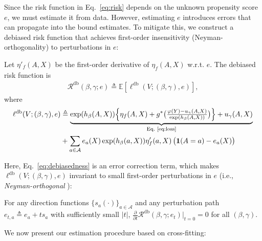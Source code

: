 Since the risk function in Eq.~\eqref{eq:risk} depends on the unknown propensity score $e$, we must estimate it from data. However, estimating $e$ introduces errors that can propagate into the bound estimates. To mitigate this, we construct a debiased risk function that achieves first-order insensitivity (Neyman-orthogonality) to perturbations in $e$:
\begin{definition}\label{def:debiased-risk}
    \normalfont
    Let $\eta'_f(A,X)$ be the first-order derivative of $\eta_f(A,X)$ w.r.t. $e$. The debiased risk function is 
    \begin{align}\label{eq:debiased-risk}
        \mathcal{R}^{\mathrm{db}}(\beta, \gamma; e) \triangleq \mathbb{E}[\ell^{\mathrm{db}}(V; (\beta, \gamma), e)],
    \end{align}
    where 
    \begin{align}
        \ell^{\mathrm{db}}(V; (\beta, \gamma), e) &\triangleq  \underbrace{ \exp(h_{\beta}(A,X))\Big\{\eta_{f}(A,X) + g^{\ast}\big( \tfrac{\varphi(Y) - u_{\gamma}(A,X)}{\exp(h_{\beta}(A,X))}\big) \Big\}  + u_{\gamma}(A,X) }_{\text{Eq.~\eqref{eq:loss}}} \\ 
        &+ \sum_{a\in\mathcal{A}} e_a(X)\exp(h_{\beta}(a,X)) \eta'_{f}(a,X)\,\big(\boldsymbol{1}(A=a) - e_a(X)\big) \label{eq:debiasedness}
    \end{align}
\end{definition}
Here, Eq.~\eqref{eq:debiasedness} is an error correction term, which makes $\ell^{\mathrm{db}}(V; (\beta, \gamma), e)$ invariant to small first-order perturbations in $e$ (i.e., \textit{Neyman-orthogonal} \citep{chernozhukov2018double}):
\begin{lemma}\label{lemma:orthogonality}
    \normalfont
    For any direction functions $\{s_a(\cdot)\}_{a \in \mathcal{A}}$ and any perturbation path $e_{t,a} \triangleq e_a + t s_a$ with sufficiently small $|t|$, $\tfrac{\partial }{\partial t}\mathcal{R}^{\mathrm{db}}(\beta,\gamma;e_t)\big\vert_{t=0} = 0$ for all $(\beta,\gamma)$. 
\end{lemma}
We now present our estimation procedure based on cross-fitting:
